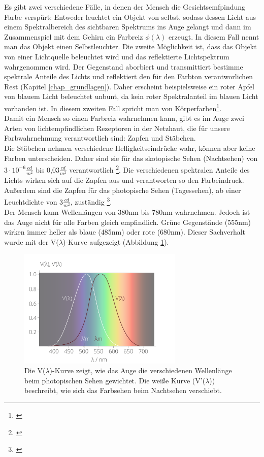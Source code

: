 Es gibt zwei verschiedene Fälle, in denen der Mensch die Gesichtsemfpindung Farbe verspürt: Entweder leuchtet ein Objekt von selbst, sodass dessen Licht aus einem Spektralbereich des sichtbaren Spektrums ins Auge gelangt und dann im Zusammenspiel mit dem Gehirn ein Farbreiz $\phi(\lambda)$ erzeugt. In diesem Fall nennt man das Objekt einen Selbstleuchter. Die zweite Möglichkeit ist, dass das Objekt von einer Lichtquelle beleuchtet wird und das reflektierte Lichtspektrum wahrgenommen wird. Der Gegenstand aborbiert und transmittiert bestimme spektrale Anteile des Lichts und reflektiert den für den Farbton verantworlichen Rest (Kapitel \ref{chap_grundlagen}). Daher erscheint beispielsweise ein roter Apfel von blauem Licht beleuchtet unbunt, da kein roter Spektralanteil im blauen Licht vorhanden ist.
In diesem zweiten Fall spricht man von Körperfarben\footnote{\cite[103]{hentschel}}.\\     
Damit ein Mensch so einen Farbreiz wahrnehmen kann, gibt es im Auge zwei Arten von lichtempfindlichen Rezeptoren in der Netzhaut, die für unsere Farbwahrnehmung verantwortlich sind: Zapfen und Stäbchen.\\
Die Stäbchen nehmen verschiedene Helligkeitseindrücke wahr, können aber keine Farben unterscheiden. Daher sind sie für das skotopische Sehen (Nachtsehen) von $3 \cdot 10^{-6} \frac{cd}{m^{2}}$ bis 0,03$\frac{cd}{m^{2}}$ verantwortlich \footnote{\cite{doccheck sko}}.
Die verschiedenen spektralen Anteile des Lichts wirken sich auf die Zapfen aus und verantworten so den Farbeindruck. Außerdem sind die Zapfen für das photopische Sehen (Tagessehen), ab einer Leuchtdichte von 3$\frac{cd}{m^{2}}$, zuständig \footnote{\cite{doccheck pho}}.\\
Der Mensch kann Wellenlängen von 380nm bis 780nm wahrnehmen. Jedoch ist das Auge nicht für alle Farben gleich empfindlich. Grüne Gegenstände (555nm) wirken immer heller als blaue (485nm) oder rote (680nm). Dieser Sachverhalt wurde mit der V($\lambda$)-Kurve  aufgezeigt (Abbildung \ref{b_augespek}).
 

\begin{figure}[H]     %
\centering
\includegraphics[width=0.7\textwidth]{bilder/augespek} 
\caption {Die V($\lambda$)-Kurve zeigt, wie das Auge die verschiedenen Wellenlänge beim photopischen Sehen gewichtet. Die weiße Kurve (V'($\lambda$)) beschreibt, wie sich das Farbsehen beim Nachtsehen verschiebt. \protect\footnotemark}\label{b_augespek}
\end{figure}

